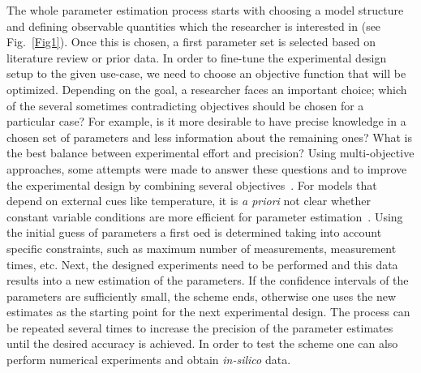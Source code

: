\documentclass[graybox]{svmult}
\begin{document}
The whole parameter estimation process starts with choosing a model structure and defining observable quantities which the researcher is interested in (see Fig.~\ref{Fig1}).
Once this is chosen, a first parameter set is selected based on literature review or prior data.
In order to fine-tune the experimental design setup to the given use-case, we need to choose an objective function that will be optimized.
Depending on the goal, a researcher faces an important choice; which of the several sometimes contradicting objectives should be chosen for a particular case?
For example, is it more desirable to have precise knowledge in a chosen set of parameters and less information about the remaining ones?
What is the best balance between experimental effort and precision?
Using multi-objective approaches, some attempts were made to answer these questions and to improve the experimental design by combining several objectives~\cite{telenOptimalExperimentDesign2012, logistRobustMultiobjectiveOptimal2011}.
For models that depend on external cues like temperature, it is {\it a priori} not clear whether constant variable conditions are more efficient for parameter estimation~\cite{versyckIntroducingOptimal1999,garciaQualityShelflifePrediction2015}.
Using the initial guess of parameters a first \ac{oed} is determined taking into account specific constraints, such as maximum number of measurements, measurement times, etc.
Next, the designed experiments need to be performed and this data results into a new estimation of the parameters.
If the confidence intervals of the parameters are sufficiently small, the scheme ends, otherwise one uses the new estimates as the starting point for the next experimental design.
The process can be repeated several times to increase the precision of the parameter estimates until the desired accuracy is achieved.
In order to test the scheme one can also perform numerical experiments and obtain {\it in-silico} data.
%
%
%
\end{document}

